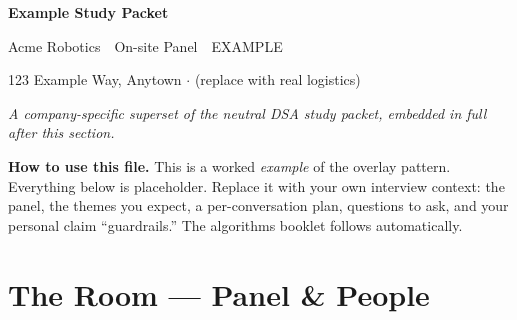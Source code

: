 
\begin{center}

    \vspace{0.45em}
    {\Huge\bfseries\sffamily\color{primary} Example Study Packet}

    \vspace{0.35em}
    {\large\color{secondary} Acme Robotics \,\textemdash\, On-site Panel \,\textemdash\, EXAMPLE}

    \vspace{0.25em}
    {\color{muted} 123 Example Way, Anytown \;$\cdot$\; (replace with real logistics)}

    \vspace{0.3em}
    {\small\itshape\color{muted} A company-specific superset of the neutral DSA study packet, embedded in full after this section.}

    \vspace{0.4em}
\end{center}

\vspace{0.4em}

\noindent\textbf{How to use this file.} This is a worked \emph{example} of the overlay pattern. Everything below is placeholder. Replace it with your own interview context: the panel, the themes you expect, a per-conversation plan, questions to ask, and your personal claim ``guardrails.'' The algorithms booklet follows automatically.

\section{The Room — Panel \& People}

